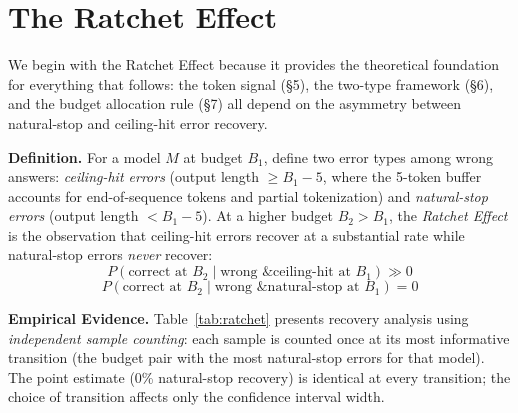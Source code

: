 \documentclass{article}
\begin{document}
\section{The Ratchet Effect}

We begin with the Ratchet Effect because it provides the theoretical foundation for everything that follows: the token signal (\S5), the two-type framework (\S6), and the budget allocation rule (\S7) all depend on the asymmetry between natural-stop and ceiling-hit error recovery.

\textbf{Definition.}
For a model $M$ at budget $B_1$, define two error types among wrong answers: \emph{ceiling-hit errors} (output length $\geq B_1 - 5$, where the 5-token buffer accounts for end-of-sequence tokens and partial tokenization) and \emph{natural-stop errors} (output length $< B_1 - 5$). At a higher budget $B_2 > B_1$, the \emph{Ratchet Effect} is the observation that ceiling-hit errors recover at a substantial rate while natural-stop errors \emph{never} recover:
$$P(\text{correct at } B_2 \mid \text{wrong \& ceiling-hit at } B_1) \gg 0$$
$$P(\text{correct at } B_2 \mid \text{wrong \& natural-stop at } B_1) = 0$$

\textbf{Empirical Evidence.}
Table~\ref{tab:ratchet} presents recovery analysis using \emph{independent sample counting}: each sample is counted once at its most informative transition (the budget pair with the most natural-stop errors for that model). The point estimate (0\% natural-stop recovery) is identical at every transition; the choice of transition affects only the confidence interval width.
\end{document}
